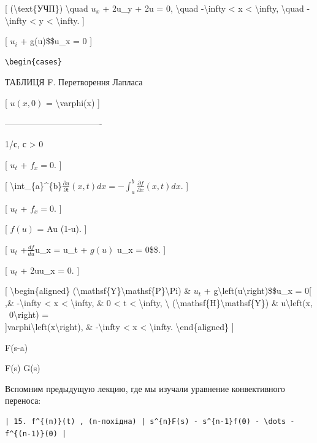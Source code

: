 \documentclass[
]{article}
\begin{document}
{{{{[} (\textbackslash text\{УЧП\}) \textbackslash quad \(u_x\) + 2u\_y +
2u = 0, \textbackslash quad -\textbackslash infty \textless{} x
\textless{} \textbackslash infty, \textbackslash quad
-\textbackslash infty \textless{} y \textless{} \textbackslash infty.
{]}

{[} \(u_i\) + g(u)\$\$u\_x = 0 {]}

\begin{verbatim}
\begin{cases}
\end{verbatim}

ТАБЛИЦЯ F. Перетворення Лапласа

{[} \(u(x, 0)\) = \textbackslash varphi(x) {]}

\textbar----------------------------------\textbar{}

1/с, с \textgreater{} 0 \textbar{}

{[} \(u_t\) + \(f_x = 0\). {]}

{[}
\textbackslash int\_\{a\}\^{}\{b\}\(\frac{\partial u}{\partial t}(x, t) dx = -\int_{a}^{b} \frac{\partial f}{\partial x}(x, t) dx\).
{]}

{[} \(u_t\) + \(f_x = 0\). {]}

{[} \(f(u)\) = Au (1-u). {]}

{[} \(u_t\) +\(\frac{df}{du}\)u\_x = u\_t + \(g(u)\) u\_x = 0\$\$. {]}

{[} \(u_t\) + 2uu\_x = 0. {]}

{[} \textbackslash begin\{aligned\}
(\textbackslash mathsf\{Y\}\textbackslash mathsf\{P\}\textbackslash Pi)
\& \(u_t\) + g\textbackslash left(u\textbackslash right)\$\$u\_x = 0{[}
,\& -\textbackslash infty \textless{} x \textless{}
\textbackslash infty, \& 0 \textless{} t \textless{}
\textbackslash infty, \textbackslash{}
(\textbackslash mathsf\{H\}\textbackslash mathsf\{Y\}) \&
u\textbackslash left(x, ~0\textbackslash right) =\\
{]}varphi\textbackslash left(x\textbackslash right), \&
-\textbackslash infty \textless{} x \textless{} \textbackslash infty.
\textbackslash end\{aligned\} {]}

F(s-a) \textbar{}

F(s) G(s) \textbar{}

Вспомним предыдущую лекцию, где мы изучали уравнение конвективного
переноса:

\begin{verbatim}
| 15. f^{(n)}(t) , (n-похідна) | s^{n}F(s) - s^{n-1}f(0) - \dots - f^{(n-1)}(0) |
\end{verbatim}

}}}
\end{document}
